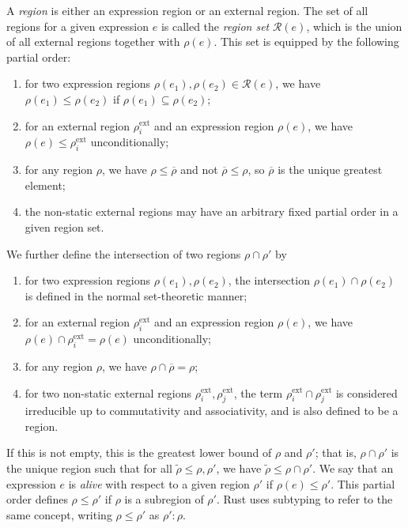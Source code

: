 \documentclass[UKenglish, 11pt, a4paper, parskip=half]{scrbook}
\newcommand{\lstatic}{\ensuremath{\overline\rho}}
\begin{document}
\begin{defn}
  A \textit{region} is either an expression region or an external region.
  The set of all regions for a given expression \( e \) is called the \textit{region set} \( \mathcal R(e) \), which is the union of all external regions together with \( \rho(e) \).
  This set is equipped by the following partial order:
  \begin{enumerate}
    \item for two expression regions \( \rho(e_1), \rho(e_2) \in \mathcal R(e) \), we have \( \rho(e_1) \leq \rho(e_2) \) if \( \rho(e_1) \subseteq \rho(e_2) \);
    \item for an external region \( \rho_i^{\mathrm{ext}} \) and an expression region \( \rho(e) \), we have \( \rho(e) \leq \rho_i^{\mathrm{ext}} \) unconditionally;
    \item for any region \( \rho \), we have \( \rho \leq \lstatic \) and not \( \lstatic \leq \rho \), so \( \lstatic \) is the unique greatest element;
    \item the non-static external regions may have an arbitrary fixed partial order in a given region set.
  \end{enumerate}
  We further define the intersection of two regions \( \rho \cap \rho' \) by
  \begin{enumerate}
    \item for two expression regions \( \rho(e_1), \rho(e_2) \), the intersection \( \rho(e_1) \cap \rho(e_2) \) is defined in the normal set-theoretic manner;
    \item for an external region \( \rho_i^{\mathrm{ext}} \) and an expression region \( \rho(e) \), we have \( \rho(e) \cap \rho_i^{\mathrm{ext}} = \rho(e) \) unconditionally;
    \item for any region \( \rho \), we have \( \rho \cap \lstatic = \rho \);
    \item for two non-static external regions \( \rho_i^{\mathrm{ext}}, \rho_j^{\mathrm{ext}} \), the term \( \rho_i^{\mathrm{ext}} \cap \rho_j^{\mathrm{ext}} \) is considered irreducible up to commutativity and associativity, and is also defined to be a region.
  \end{enumerate}
  If this is not empty, this is the greatest lower bound of \( \rho \) and \( \rho' \); that is, \( \rho \cap \rho' \) is the unique region such that for all \( \widetilde \rho \leq \rho, \rho' \), we have \( \widetilde \rho \leq \rho \cap \rho' \).
  We say that an expression \( e \) is \textit{alive} with respect to a given region \( \rho' \) if \( \rho(e) \leq \rho' \).
  This partial order defines \( \rho \leq \rho' \) if \( \rho \) is a subregion of \( \rho' \).
  Rust uses subtyping to refer to the same concept, writing \( \rho \leq \rho' \) as \( \rho' : \rho \).
\end{defn}
\end{document}
